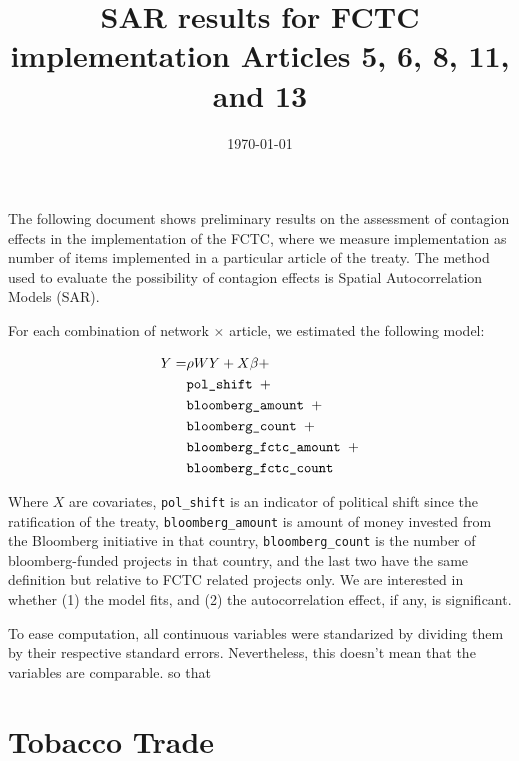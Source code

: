 \documentclass[10pt]{article}
\title{SAR results for FCTC implementation Articles 5, 6, 8, 11, and 13}
\date{\today}
\begin{document}
\maketitle
\tableofcontents

The following document shows preliminary results on the assessment of contagion
effects in the implementation of the FCTC, where we measure implementation as
number of items implemented in a particular article of the treaty. The method
used to evaluate the possibility of contagion effects is Spatial Autocorrelation
Models (SAR). 

For each combination of network $\times$ article, we estimated the following
model:

\begin{align}
Y = & \rho W Y + X\beta + \\
 & \mbox{\tt pol\_shift } + \\
 & \mbox{\tt bloomberg\_amount } + \\
 & \mbox{\tt bloomberg\_count } + \\
 & \mbox{\tt bloomberg\_fctc\_amount } + \\
 & \mbox{\tt bloomberg\_fctc\_count }
\end{align}

Where $X$ are covariates, \texttt{pol\_shift} is an indicator of political shift
since the ratification of the treaty, \texttt{bloomberg\_amount} is
amount of money invested from the Bloomberg initiative in that country, 
\texttt{bloomberg\_count} is the number of bloomberg-funded projects in that 
country, and the last two have the same definition but relative to FCTC related
projects only. We are interested in whether (1) the model fits,
and (2) the autocorrelation effect, if any, is significant.

To ease computation, all continuous variables were standarized by dividing them
by their respective standard errors. Nevertheless, this doesn't mean that the
variables are comparable.
so that 

\pagebreak

\section{Tobacco Trade}






\end{document}
